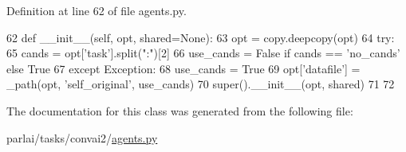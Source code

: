 Definition at line 62 of file agents.\+py.


\begin{DoxyCode}
62     \textcolor{keyword}{def }\_\_init\_\_(self, opt, shared=None):
63         opt = copy.deepcopy(opt)
64         \textcolor{keywordflow}{try}:
65             cands = opt[\textcolor{stringliteral}{'task'}].split(\textcolor{stringliteral}{":"})[2]
66             use\_cands = \textcolor{keyword}{False} \textcolor{keywordflow}{if} cands == \textcolor{stringliteral}{'no\_cands'} \textcolor{keywordflow}{else} \textcolor{keyword}{True}
67         \textcolor{keywordflow}{except} Exception:
68             use\_cands = \textcolor{keyword}{True}
69         opt[\textcolor{stringliteral}{'datafile'}] = \_path(opt, \textcolor{stringliteral}{'self\_original'}, use\_cands)
70         super().\_\_init\_\_(opt, shared)
71 
72 
\end{DoxyCode}


The documentation for this class was generated from the following file\+:\begin{DoxyCompactItemize}
\item 
parlai/tasks/convai2/\hyperlink{parlai_2tasks_2convai2_2agents_8py}{agents.\+py}\end{DoxyCompactItemize}
